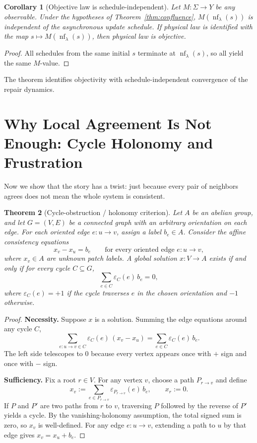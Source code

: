 \documentclass[11pt]{article}
\newtheorem{theorem}{Theorem}[section]
\newtheorem{corollary}[theorem]{Corollary}
\theoremstyle{remark}
\theoremstyle{plain}
\begin{document}
\begin{corollary}[Objective law is schedule-independent]\label{cor:objective}
Let $M:\Sigma\to Y$ be any observable. Under the hypotheses of Theorem~\ref{thm:confluence}, $M(\operatorname{nf}_\lambda(s))$ is independent of the asynchronous update schedule. If physical law is identified with the map $s\mapsto M(\operatorname{nf}_\lambda(s))$, then physical law is objective.
\end{corollary}

\begin{proof}
All schedules from the same initial $s$ terminate at $\operatorname{nf}_\lambda(s)$, so all yield the same $M$-value.
\end{proof}

The theorem identifies objectivity with schedule-independent convergence of the repair dynamics.


\section{Why Local Agreement Is Not Enough: Cycle Holonomy and Frustration}

Now we show that the story has a twist: just because every pair of neighbors agrees does not mean the whole system is consistent.

\begin{theorem}[Cycle-obstruction / holonomy criterion]\label{thm:holonomy}
Let $A$ be an abelian group, and let $G=(V,E)$ be a connected graph with an arbitrary orientation on each edge. For each oriented edge $e:u\to v$, assign a label $b_e\in A$. Consider the affine consistency equations
\[
x_v - x_u = b_e
\qquad
\text{for every oriented edge } e:u\to v,
\]
where $x_v\in A$ are unknown patch labels. A global solution $x:V\to A$ exists if and only if for every cycle $C\subseteq G$,
\[
\sum_{e\in C}\varepsilon_C(e)\, b_e = 0,
\]
where $\varepsilon_C(e)=+1$ if the cycle traverses $e$ in the chosen orientation and $-1$ otherwise.
\end{theorem}

\begin{proof}
\textbf{Necessity.} Suppose $x$ is a solution. Summing the edge equations around any cycle $C$,
\[
\sum_{e:u\to v\in C}\varepsilon_C(e)\,(x_v-x_u)
=
\sum_{e\in C}\varepsilon_C(e)\,b_e.
\]
The left side telescopes to $0$ because every vertex appears once with $+$ sign and once with $-$ sign.

\textbf{Sufficiency.} Fix a root $r\in V$. For any vertex $v$, choose a path $P_{r\to v}$ and define
\[
x_v := \sum_{e\in P_{r\to v}} \varepsilon_{P_{r\to v}}(e)\, b_e,
\qquad x_r:=0.
\]
If $P$ and $P'$ are two paths from $r$ to $v$, traversing $P$ followed by the reverse of $P'$ yields a cycle. By the vanishing-holonomy assumption, the total signed sum is zero, so $x_v$ is well-defined. For any edge $e:u\to v$, extending a path to $u$ by that edge gives $x_v = x_u + b_e$.
\end{proof}
\end{document}
